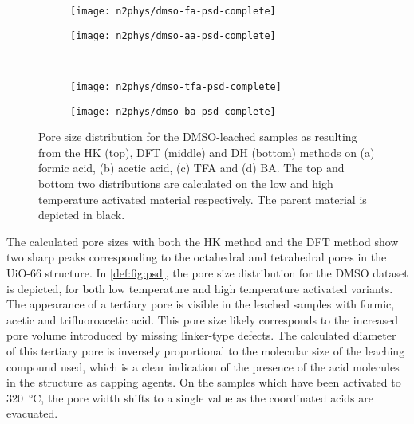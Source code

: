 \begin{figure}[p]
    \centering

    \begin{subfigure}{0.4\linewidth}
		\parbox[c]{0.12\linewidth}{\caption{}%
			\label{def:fig:psd-dmso-fa}}%
		\parbox[b]{0.88\linewidth}{%
			\texttt{[image: n2phys/dmso-fa-psd-complete]}%
		}%
    \end{subfigure}%
    \begin{subfigure}{0.4\linewidth}
		\parbox[c]{0.12\linewidth}{\caption{}%
			\label{def:fig:psd-dmso-aa}}%
		\parbox[b]{0.88\linewidth}{%
			\texttt{[image: n2phys/dmso-aa-psd-complete]}%
		}%
    \end{subfigure}%
    \\
    \begin{subfigure}{0.4\linewidth}
		\parbox[c]{0.12\linewidth}{\caption{}%
			\label{def:fig:psd-dmso-tfa}}%
		\parbox[b]{0.88\linewidth}{%
			\texttt{[image: n2phys/dmso-tfa-psd-complete]}%
		}%
    \end{subfigure}%
    \begin{subfigure}{0.4\linewidth}
		\parbox[c]{0.12\linewidth}{\caption{}%
			\label{def:fig:psd-dmso-ba}}%
		\parbox[b]{0.88\linewidth}{%
			\texttt{[image: n2phys/dmso-ba-psd-complete]}%
		}%
    \end{subfigure}%

    \caption{Pore size distribution for the DMSO-leached
    samples as resulting from the HK (top), DFT (middle) and DH 
    (bottom) methods on (a) formic acid, (b) acetic acid, (c) TFA and 
    (d) BA. The top and bottom two distributions are
    calculated on the low and high temperature activated material
    respectively. The parent material is depicted in black.}%
    \label{def:fig:psd}
        
\end{figure}

The calculated pore sizes with both the HK method and the DFT method 
show two sharp peaks corresponding to the octahedral and tetrahedral
pores in the UiO-66 structure. In \autoref{def:fig:psd}, the pore
size distribution for the DMSO dataset is depicted, for both low
temperature and high temperature activated variants. The appearance of 
a tertiary pore is visible in the leached samples with formic,
acetic and trifluoroacetic acid. This pore size likely corresponds
to the increased pore volume introduced by missing linker-type 
defects. The calculated diameter of this tertiary pore is
inversely proportional to the molecular size of the 
leaching compound used, which is a clear indication of the presence of 
the acid molecules in the structure as capping agents. On the samples
which have been activated to \SI{320}{\degreeCelsius}, the pore width
shifts to a single value as the coordinated acids are evacuated.

